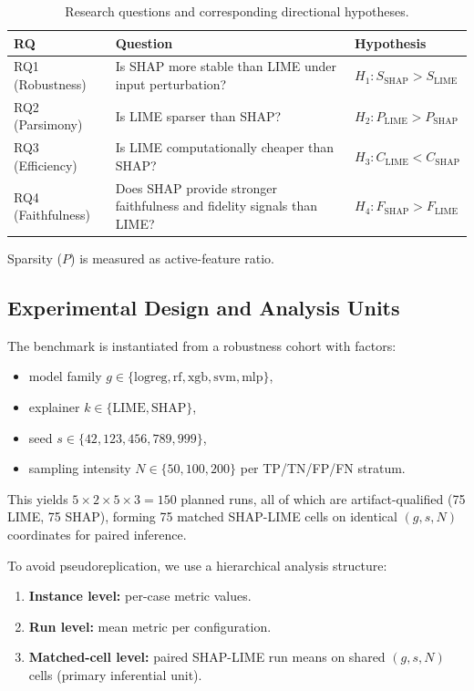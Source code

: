 \documentclass[twoside,11pt]{article}
\begin{document}
\begin{table}[h]
\centering
\caption{Research questions and corresponding directional hypotheses.}
\label{tab:rqs}
\begin{tabularx}{\linewidth}{p{2.1cm} X l}
\toprule
\textbf{RQ} & \textbf{Question} & \textbf{Hypothesis} \\
\midrule
RQ1 (Robustness) & Is SHAP more stable than LIME under input perturbation? & $H_1: S_{\mathrm{SHAP}} > S_{\mathrm{LIME}}$ \\
RQ2 (Parsimony) & Is LIME sparser than SHAP? & $H_2: P_{\mathrm{LIME}} > P_{\mathrm{SHAP}}$ \\
RQ3 (Efficiency) & Is LIME computationally cheaper than SHAP? & $H_3: C_{\mathrm{LIME}} < C_{\mathrm{SHAP}}$ \\
RQ4 (Faithfulness) & Does SHAP provide stronger faithfulness and fidelity signals than LIME? & $H_4: F_{\mathrm{SHAP}} > F_{\mathrm{LIME}}$ \\
\bottomrule
\end{tabularx}
\end{table}
Sparsity ($P$) is measured as active-feature ratio.

\subsection{Experimental Design and Analysis Units}
\label{sec:design}

The benchmark is instantiated from a robustness cohort with factors:
\begin{itemize}[leftmargin=*]
\item model family $g \in \{\mathrm{logreg}, \mathrm{rf}, \mathrm{xgb},
\mathrm{svm}, \mathrm{mlp}\}$,
\item explainer $k \in \{\mathrm{LIME}, \mathrm{SHAP}\}$,
\item seed $s \in \{42, 123, 456, 789, 999\}$,
\item sampling intensity $N \in \{50, 100, 200\}$ per TP/TN/FP/FN stratum.
\end{itemize}

This yields $5 \times 2 \times 5 \times 3 = 150$ planned runs, all of
which are artifact-qualified (75 LIME, 75 SHAP), forming 75 matched
SHAP-LIME cells on identical $(g, s, N)$ coordinates for paired inference.

To avoid pseudoreplication, we use a hierarchical analysis structure:
\begin{enumerate}[leftmargin=*]
\item \textbf{Instance level:} per-case metric values.
\item \textbf{Run level:} mean metric per configuration.
\item \textbf{Matched-cell level:} paired SHAP-LIME run means on shared
$(g, s, N)$ cells (primary inferential unit).
\end{enumerate}
\end{document}
